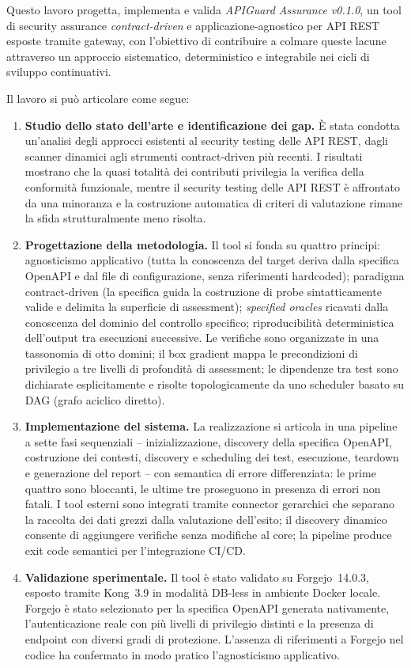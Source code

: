 \documentclass{scrartcl}
\begin{document}
Questo lavoro progetta, implementa e valida \emph{APIGuard Assurance v0.1.0}, un tool di security assurance \emph{contract-driven} e applicazione-agnostico per API REST esposte tramite gateway, con l'obiettivo di contribuire a colmare queste lacune attraverso un approccio sistematico, deterministico e integrabile nei cicli di sviluppo continuativi.

Il lavoro si può articolare come segue:
\begin{enumerate}
	\item \textbf{Studio dello stato dell'arte e identificazione dei gap.} È stata condotta un'analisi degli approcci esistenti al security testing delle API REST, dagli scanner dinamici agli strumenti contract-driven più recenti. I risultati mostrano che la quasi totalità dei contributi privilegia la verifica della conformità funzionale, mentre il security testing delle API REST è affrontato da una minoranza e la costruzione automatica di criteri di valutazione rimane la sfida strutturalmente meno risolta.

	\item \textbf{Progettazione della metodologia.} Il tool si fonda su quattro principi: agnosticismo applicativo (tutta la conoscenza del target deriva dalla specifica OpenAPI e dal file di configurazione, senza riferimenti hardcoded); paradigma contract-driven (la specifica guida la costruzione di probe sintatticamente valide e delimita la superficie di assessment); \emph{specified oracles} ricavati dalla conoscenza del dominio del controllo specifico; riproducibilità deterministica dell'output tra esecuzioni successive. Le verifiche sono organizzate in una tassonomia di otto domini; il box gradient mappa le precondizioni di privilegio a tre livelli di profondità di assessment; le dipendenze tra test sono dichiarate esplicitamente e risolte topologicamente da uno scheduler basato su DAG (grafo aciclico diretto).

	\item \textbf{Implementazione del sistema.} La realizzazione si articola in una pipeline a sette fasi sequenziali -- inizializzazione, discovery della specifica OpenAPI, costruzione dei contesti, discovery e scheduling dei test, esecuzione, teardown e generazione del report -- con semantica di errore differenziata: le prime quattro sono bloccanti, le ultime tre proseguono in presenza di errori non fatali. I tool esterni sono integrati tramite connector gerarchici che separano la raccolta dei dati grezzi dalla valutazione dell'esito; il discovery dinamico consente di aggiungere verifiche senza modifiche al core; la pipeline produce exit code semantici per l'integrazione CI/CD.

	\item \textbf{Validazione sperimentale.} Il tool è stato validato su Forgejo~14.0.3, esposto tramite Kong~3.9 in modalità DB-less in ambiente Docker locale. Forgejo è stato selezionato per la specifica OpenAPI generata nativamente, l'autenticazione reale con più livelli di privilegio distinti e la presenza di endpoint con diversi gradi di protezione. L'assenza di riferimenti a Forgejo nel codice ha confermato in modo pratico l'agnosticismo applicativo.
\end{enumerate}
\end{document}
